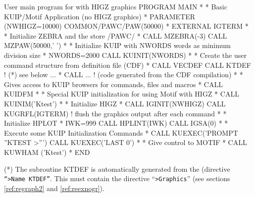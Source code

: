 \begin{XMPt}{User main program for \KUIPMotif{} with HIGZ graphics}
      PROGRAM MAIN
*
* Basic KUIP/Motif Application (no HIGZ graphics)
*
      PARAMETER (NWHIGZ=10000)
      COMMON/PAWC/PAW(50000)
*
      EXTERNAL      IGTERM
*
* Initialize ZEBRA and the store /PAWC/
*
      CALL MZEBRA(-3)
      CALL MZPAW(50000,' ')
*
* Initialize KUIP with NWORDS words as minimum division size
*
      NWORDS=2000
      CALL KUINIT(NWORDS)
*
* Create the user command structure from definition file (CDF)
*
      CALL VECDEF
      CALL KTDEF            ! (*) see below ...
*     CALL ...              ! (code generated from the CDF compilation)
*
* Gives access to KUIP browsers for commands, files and macros
*
      CALL KUIDFM
*
* Special KUIP initialization for using Motif with HIGZ
*
      CALL KUINIM('Ktest')
*
* Initialize HIGZ
*
      CALL IGINIT(NWHIGZ)
      CALL KUGRFL(IGTERM)   ! flush the graphics output after each command
*
* Initialize HPLOT
*
      IWK=999
      CALL HPLINT(IWK)
      CALL IGSA(0)
*
* Execute some KUIP Initialization Commands
*
      CALL KUEXEC('PROMPT ''KTEST >''')
      CALL KUEXEC('LAST 0')
*
* Give control to MOTIF
*
      CALL KUWHAM ('Ktest')
*
      END
\end{XMPt}

(*)  The subroutine KTDEF is automatically generated from the \CDF{}
(directive {\tt ``>Name KTDEF''}. This \CDF{} must contain the directive 
``{\tt >Graphics}'' (see sections \ref{ref:regraph2} and \ref{ref:reexnogr}).

